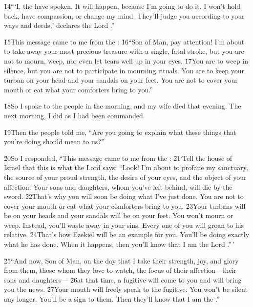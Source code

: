 \v{14}```I, the  have spoken. It will happen, because I'm going to do it. I won't hold back, have compassion, or change my mind. They'll judge you according to your ways and deeds,' declares the Lord .''

\v{15}This message came to me from the : \v{16}``Son of Man, pay attention! I'm about to take away your most precious treasure with a single, fatal stroke, but you are not to mourn, weep, nor even let tears well up in your eyes. \v{17}You are to weep in silence, but you are not to participate in mourning rituals. You are to keep your turban on your head and your sandals on your feet. You are not to cover your mouth or eat what your comforters bring to you.''

\v{18}So I spoke to the people in the morning, and my wife died that evening. The next morning, I did as I had been commanded.

\v{19}Then the people told me, ``Are you going to explain what these things that you're doing should mean to us?''

\v{20}So I responded, ``This message came to me from the : \v{21}`Tell the house of Israel that this is what the Lord  says: ``Look! I'm about to profane my sanctuary, the source of your proud strength, the desire of your eyes, and the object of your affection. Your sons and daughters, whom you've left behind, will die by the sword. \v{22}That's why you will soon be doing what I've just done. You are not to cover your mouth or eat what your comforters bring to you. \v{23}Your turbans will be on your heads and your sandals will be on your feet. You won't mourn or weep. Instead, you'll waste away in your sins. Every one of you will groan to his relative. \v{24}That's how Ezekiel will be an example for you. You'll be doing exactly what he has done. When it happens, then you'll know that I am the Lord .''\,'

\v{25}``And now, Son of Man, on the day that I take their strength, joy, and glory from them, those whom they love to watch, the focus of their affection---their sons and daughters--- \v{26}at that time, a fugitive will come to you and will bring you the news. \v{27}Your mouth will freely speak to the fugitive. You won't be silent any longer. You'll be a sign to them. Then they'll know that I am the .''

